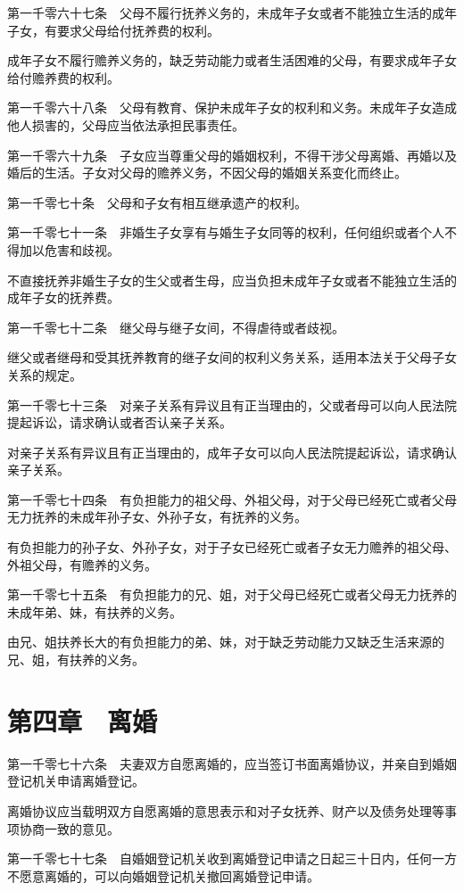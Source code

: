 \documentclass[UTF8,12pt,a4paper]{ctexbook}
\begin{document}
第一千零六十七条　父母不履行抚养义务的，未成年子女或者不能独立生活的成年子女，有要求父母给付抚养费的权利。

成年子女不履行赡养义务的，缺乏劳动能力或者生活困难的父母，有要求成年子女给付赡养费的权利。

第一千零六十八条　父母有教育、保护未成年子女的权利和义务。未成年子女造成他人损害的，父母应当依法承担民事责任。

第一千零六十九条　子女应当尊重父母的婚姻权利，不得干涉父母离婚、再婚以及婚后的生活。子女对父母的赡养义务，不因父母的婚姻关系变化而终止。

第一千零七十条　父母和子女有相互继承遗产的权利。

第一千零七十一条　非婚生子女享有与婚生子女同等的权利，任何组织或者个人不得加以危害和歧视。

不直接抚养非婚生子女的生父或者生母，应当负担未成年子女或者不能独立生活的成年子女的抚养费。

第一千零七十二条　继父母与继子女间，不得虐待或者歧视。

继父或者继母和受其抚养教育的继子女间的权利义务关系，适用本法关于父母子女关系的规定。

第一千零七十三条　对亲子关系有异议且有正当理由的，父或者母可以向人民法院提起诉讼，请求确认或者否认亲子关系。

对亲子关系有异议且有正当理由的，成年子女可以向人民法院提起诉讼，请求确认亲子关系。

第一千零七十四条　有负担能力的祖父母、外祖父母，对于父母已经死亡或者父母无力抚养的未成年孙子女、外孙子女，有抚养的义务。

有负担能力的孙子女、外孙子女，对于子女已经死亡或者子女无力赡养的祖父母、外祖父母，有赡养的义务。

第一千零七十五条　有负担能力的兄、姐，对于父母已经死亡或者父母无力抚养的未成年弟、妹，有扶养的义务。

由兄、姐扶养长大的有负担能力的弟、妹，对于缺乏劳动能力又缺乏生活来源的兄、姐，有扶养的义务。

\section*{第四章　离婚}

第一千零七十六条　夫妻双方自愿离婚的，应当签订书面离婚协议，并亲自到婚姻登记机关申请离婚登记。

离婚协议应当载明双方自愿离婚的意思表示和对子女抚养、财产以及债务处理等事项协商一致的意见。

第一千零七十七条　自婚姻登记机关收到离婚登记申请之日起三十日内，任何一方不愿意离婚的，可以向婚姻登记机关撤回离婚登记申请。
\end{document}

